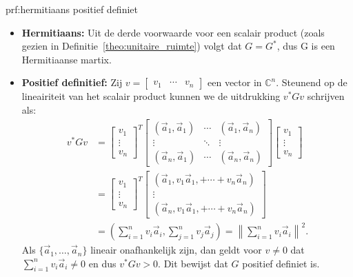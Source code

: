 \begin{prf}{prf:hermitiaans positief definiet}
    \begin{itemize}
        \item 
            \textbf{Hermitiaans:} Uit de derde voorwaarde voor een scalair product (zoals gezien in Definitie~\ref{theo:unitaire_ruimte}) volgt dat $G = G^*$, dus G is een Hermitiaanse martix.
        \item 
            \textbf{Positief definitief:} Zij $v = \begin{bmatrix}
                v_1 & \cdots & v_n
            \end{bmatrix}$
            een vector in $\mathbb{C}^n$. Steunend op de lineairiteit van het scalair product kunnen we de uitdrukking $v^*Gv$ schrijven als:
            \begin{align*}
                v^*Gv 
                    &= \begin{bmatrix}
                        v_1 \\
                        \vdots \\
                        v_n
                    \end{bmatrix}^T
                    \begin{bmatrix}
                        (\vec{a}_1,\vec{a}_1) & \cdots & (\vec{a}_1,\vec{a}_n) \\
                        \vdots & \ddots & \vdots \\
                        (\vec{a}_n,\vec{a}_1) & \cdots & (\vec{a}_n,\vec{a}_n)
                    \end{bmatrix}
                    \begin{bmatrix}
                        v_1 \\ \vdots \\ v_n
                    \end{bmatrix} \\
                    &= \begin{bmatrix}
                        v_1 \\
                        \vdots \\
                        v_n
                    \end{bmatrix}^T
                    \begin{bmatrix}
                        (\vec{a}_1, v_1\vec{a}_1, + \cdots + v_n\vec{a}_n) \\
                        \vdots \\
                        (\vec{a}_n, v_1\vec{a}_1, + \cdots + v_n\vec{a}_n)
                    \end{bmatrix} \\
                    &= \left(\sum_{i=1}^n v_i\vec{a}_i, \sum_{j=1}^n v_j\vec{a}_j\right) 
                    = \left\| \sum_{i=1}^n v_i\vec{a}_i \right\|^2.
            \end{align*}
            Als $\{\vec{a}_1,\ldots,\vec{a}_n\}$ lineair onafhankelijk zijn, dan geldt voor $v\neq 0$ dat $\sum_{i=1}^n v_i\vec{a}_i \neq 0$ en dus $v^*Gv > 0$. Dit bewijst dat $G$ positief definiet is.
    \end{itemize}
\end{prf}

